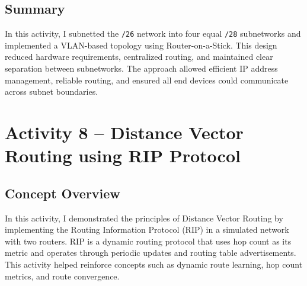 \documentclass[11pt,a4paper]{article}
\begin{document}
\subsection{Summary} 

In this activity, I subnetted the \texttt{/26} network into four equal \texttt{/28} subnetworks and implemented a VLAN-based topology using Router-on-a-Stick. This design reduced hardware requirements, centralized routing, and maintained clear separation between subnetworks. The approach allowed efficient IP address management, reliable routing, and ensured all end devices could communicate across subnet boundaries.

\section{Activity 8 – Distance Vector Routing using RIP Protocol}

\subsection{Concept Overview}
In this activity, I demonstrated the principles of Distance Vector Routing by implementing the Routing Information Protocol (RIP) in a simulated network with two routers. RIP is a dynamic routing protocol that uses hop count as its metric and operates through periodic updates and routing table advertisements. This activity helped reinforce concepts such as dynamic route learning, hop count metrics, and route convergence.
\end{document}
